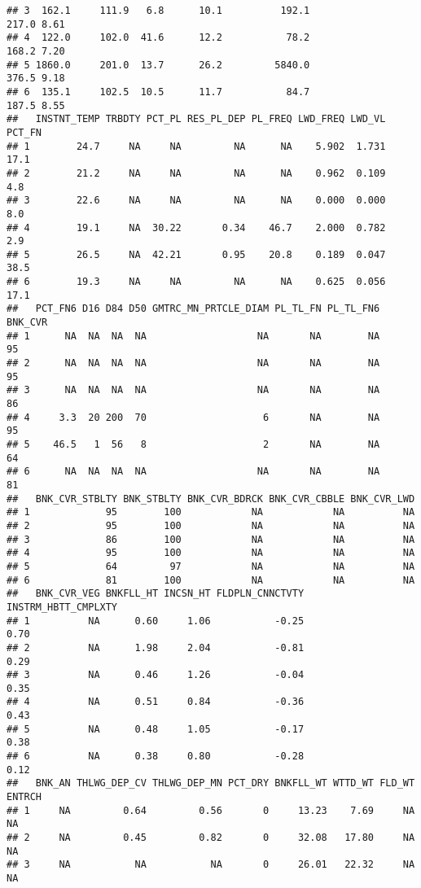 \documentclass[]{article}
\begin{document}
\begin{verbatim}
## 3  162.1     111.9   6.8      10.1          192.1              217.0 8.61
## 4  122.0     102.0  41.6      12.2           78.2              168.2 7.20
## 5 1860.0     201.0  13.7      26.2         5840.0              376.5 9.18
## 6  135.1     102.5  10.5      11.7           84.7              187.5 8.55
##   INSTNT_TEMP TRBDTY PCT_PL RES_PL_DEP PL_FREQ LWD_FREQ LWD_VL PCT_FN
## 1        24.7     NA     NA         NA      NA    5.902  1.731   17.1
## 2        21.2     NA     NA         NA      NA    0.962  0.109    4.8
## 3        22.6     NA     NA         NA      NA    0.000  0.000    8.0
## 4        19.1     NA  30.22       0.34    46.7    2.000  0.782    2.9
## 5        26.5     NA  42.21       0.95    20.8    0.189  0.047   38.5
## 6        19.3     NA     NA         NA      NA    0.625  0.056   17.1
##   PCT_FN6 D16 D84 D50 GMTRC_MN_PRTCLE_DIAM PL_TL_FN PL_TL_FN6 BNK_CVR
## 1      NA  NA  NA  NA                   NA       NA        NA      95
## 2      NA  NA  NA  NA                   NA       NA        NA      95
## 3      NA  NA  NA  NA                   NA       NA        NA      86
## 4     3.3  20 200  70                    6       NA        NA      95
## 5    46.5   1  56   8                    2       NA        NA      64
## 6      NA  NA  NA  NA                   NA       NA        NA      81
##   BNK_CVR_STBLTY BNK_STBLTY BNK_CVR_BDRCK BNK_CVR_CBBLE BNK_CVR_LWD
## 1             95        100            NA            NA          NA
## 2             95        100            NA            NA          NA
## 3             86        100            NA            NA          NA
## 4             95        100            NA            NA          NA
## 5             64         97            NA            NA          NA
## 6             81        100            NA            NA          NA
##   BNK_CVR_VEG BNKFLL_HT INCSN_HT FLDPLN_CNNCTVTY INSTRM_HBTT_CMPLXTY
## 1          NA      0.60     1.06           -0.25                0.70
## 2          NA      1.98     2.04           -0.81                0.29
## 3          NA      0.46     1.26           -0.04                0.35
## 4          NA      0.51     0.84           -0.36                0.43
## 5          NA      0.48     1.05           -0.17                0.38
## 6          NA      0.38     0.80           -0.28                0.12
##   BNK_AN THLWG_DEP_CV THLWG_DEP_MN PCT_DRY BNKFLL_WT WTTD_WT FLD_WT ENTRCH
## 1     NA         0.64         0.56       0     13.23    7.69     NA     NA
## 2     NA         0.45         0.82       0     32.08   17.80     NA     NA
## 3     NA           NA           NA       0     26.01   22.32     NA     NA

\end{verbatim}
\end{document}
